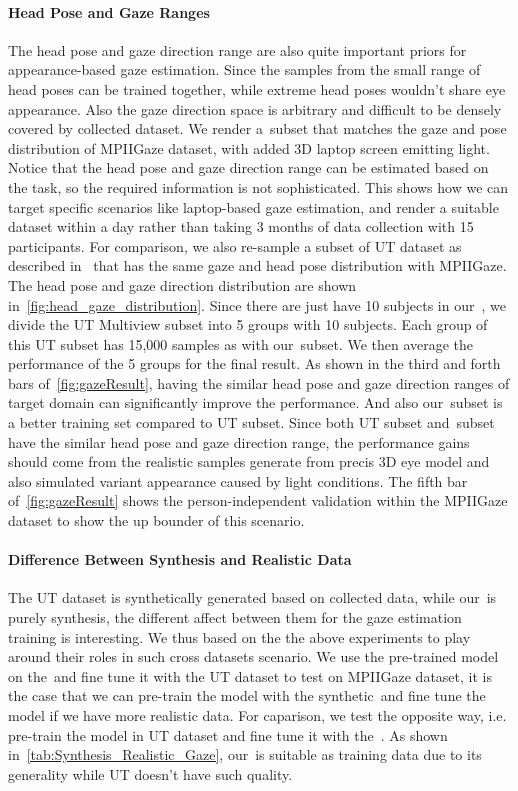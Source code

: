 \paragraph{Head Pose and Gaze Ranges}
The head pose and gaze direction range are also quite important priors for appearance-based gaze estimation. Since the samples from the small range of head poses can be trained together, while extreme head poses wouldn't share eye appearance. Also the gaze direction space is arbitrary and difficult to be densely covered by collected dataset. 
We render a~\dataset subset that matches the gaze and pose distribution of MPIIGaze dataset, with added 3D laptop screen emitting light. Notice that the head pose and gaze direction range can be estimated based on the task, so the required information is not sophisticated. This shows how we can target specific scenarios like laptop-based gaze estimation, and render a suitable dataset within a day rather than taking 3 months of data collection with 15 participants. 
For comparison, we also re-sample a subset of UT dataset as described in~\cite{zhang15_cvpr} that has the same gaze and head pose distribution with MPIIGaze. The head pose and gaze direction distribution are shown in~\autoref{fig:head_gaze_distribution}. Since there are just have 10 subjects in our~\dataset, we divide the UT Multiview subset into 5 groups with 10 subjects. Each group of this UT subset has 15,000 samples as with our~\dataset subset. We then average the performance of the 5 groups for the final result. 
As shown in the third and forth bars of~\autoref{fig:gazeResult}, having the similar head pose and gaze direction ranges of target domain can significantly improve the performance. And also our~\dataset subset is a better training set compared to UT subset. Since both UT subset and~\dataset subset have the similar head pose and gaze direction range, the performance gains should come from the realistic samples generate from precis 3D eye model and also simulated variant appearance caused by light conditions.
The fifth bar of~\autoref{fig:gazeResult} shows the person-independent validation within the MPIIGaze dataset to show the up bounder of this scenario.

\paragraph{Difference Between Synthesis and Realistic Data}
The UT dataset is synthetically generated based on collected data, while our~\dataset is purely synthesis, the different affect between them for the gaze estimation training is interesting. We thus based on the the above experiments to play around their roles in such cross datasets scenario.
We use the pre-trained model on the~\dataset and fine tune it with the UT dataset to test on MPIIGaze dataset, it is the case that we can pre-train the model with the synthetic~\dataset and fine tune the model if we have more realistic data. For caparison, we test the opposite way, i.e. pre-train the model in UT dataset and fine tune it with the~\dataset. As shown in~\autoref{tab:Synthesis_Realistic_Gaze}, our~\dataset is suitable as training data due to its generality while UT doesn't have such quality. 

